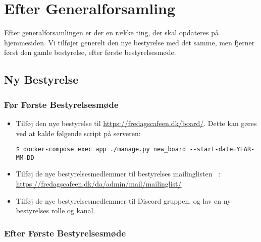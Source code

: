 \section{Efter Generalforsamling}
\label{sec:efter-generalforsamling}

Efter generalforsamlingen er der en række ting, der skal opdateres på hjemmesiden.
Vi tilføjer generelt den nye bestyrelse med det samme, men fjerner først den gamle bestyrelse, 
efter første bestyrelsesmøde.

\subsection{Ny Bestyrelse}
\label{sec:ny-bestyrelse}

\subsubsection{Før Første Bestyrelsesmøde}
\label{sec:foer-foerste-bestyrelsesmoede}

\begin{itemize}
    \item Tilføj den nye bestyrelse til \url{https://fredagscafeen.dk/board/}. 
    Dette kan gøres ved at kalde følgende script på serveren:
    {\small\begin{verbatim}
$ docker-compose exec app ./manage.py new_board --start-date=YEAR-MM-DD\end{verbatim}}
    \item Tilføj de nye bestyrelsesmedlemmer til bestyrelses mailinglisten \bestmail~:\\
    {\small\url{https://fredagscafeen.dk/da/admin/mail/mailinglist/}}
    \item Tilføj de nye bestyrelsesmedlemmer til Discord gruppen, og lav en ny bestyrelses rolle og kanal.
\end{itemize}

\subsubsection{Efter Første Bestyrelsesmøde}
\label{sec:efter-foerste-bestyrelsesmoede}

